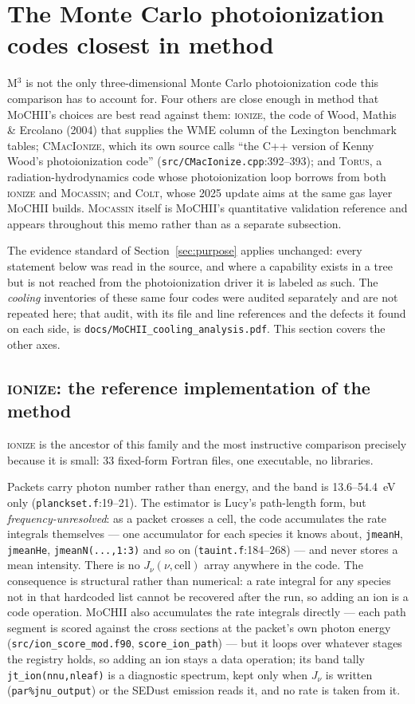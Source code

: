 \documentclass[english,a4paper]{my_memo}
\newcommand{\code}[1]{\texttt{#1}}
\newcommand{\MoCHII}{\textsc{MoCHII}}
\newcommand{\Mthree}{M$^3$}
\newcommand{\Wood}{\textsc{ionize}}
\newcommand{\CMI}{\textsc{CMacIonize}}
\newcommand{\Torus}{\textsc{Torus}}
\newcommand{\Mocassin}{\textsc{Mocassin}}
\newcommand{\Colt}{\textsc{Colt}}
\begin{document}
\section{The Monte Carlo photoionization codes closest in method}
\label{sec:others}

\Mthree{} is not the only three-dimensional Monte Carlo photoionization code
this comparison has to account for.  Four others are close enough in method
that \MoCHII{}'s choices are best read against them: \Wood{}, the code of
Wood, Mathis \& Ercolano (2004) that supplies the WME column of the Lexington
benchmark tables; \CMI{}, which its own source calls ``the C++ version of
Kenny Wood's photoionization code'' (\code{src/CMacIonize.cpp}:392--393); and
\Torus{}, a radiation-hydrodynamics code whose photoionization loop borrows
from both \Wood{} and \Mocassin{}; and \Colt{}, whose 2025 update aims at
the same gas layer \MoCHII{} builds.  \Mocassin{} itself is \MoCHII{}'s
quantitative validation reference and appears throughout this memo rather
than as a separate subsection.

The evidence standard of Section~\ref{sec:purpose} applies unchanged: every
statement below was read in the source, and where a capability exists in a
tree but is not reached from the photoionization driver it is labeled as
such.  The \emph{cooling} inventories of these same four codes were audited
separately and are not repeated here; that audit, with its file and line
references and the defects it found on each side, is
\code{docs/MoCHII\_cooling\_analysis.pdf}.  This section covers the other
axes.

\subsection{\Wood{}: the reference implementation of the method}

\Wood{} is the ancestor of this family and the most instructive comparison
precisely because it is small: 33 fixed-form Fortran files, one executable,
no libraries.

Packets carry photon number rather than energy, and the band is
13.6--54.4~eV only (\code{planckset.f}:19--21).  The estimator is
Lucy's path-length form, but \emph{frequency-unresolved}: as a packet crosses
a cell, the code accumulates the rate integrals themselves --- one
accumulator for each species it knows about, \code{jmeanH},
\code{jmeanHe}, \code{jmeanN(...,1:3)} and so on
(\code{tauint.f}:184--268) --- and never stores a mean intensity.  There is
no $J_\nu(\nu,\mathrm{cell})$ array anywhere in the code.  The consequence
is structural rather than numerical: a rate integral for any species not in
that hardcoded list cannot be recovered after the run, so adding an ion is a
code operation.  \MoCHII{} also accumulates the rate integrals directly ---
each path segment is scored against the cross sections at the packet's own
photon energy (\code{src/ion\_score\_mod.f90}, \code{score\_ion\_path}) ---
but it loops over whatever stages the registry holds, so adding an ion stays a
data operation; its band tally \code{jt\_ion(nnu,nleaf)} is a diagnostic
spectrum, kept only when $J_\nu$ is written (\code{par\%jnu\_output}) or the
SEDust emission reads it, and no rate is taken from it.
\end{document}
